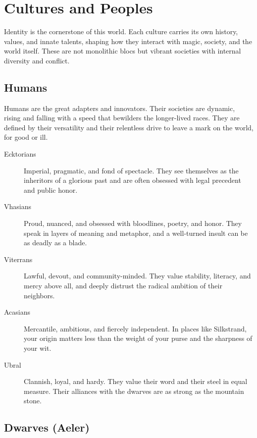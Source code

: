 \section*{Cultures and Peoples}

Identity is the cornerstone of this world. Each culture carries its own history, values, and innate talents, shaping how they interact with magic, society, and the world itself. These are not monolithic blocs but vibrant societies with internal diversity and conflict.

\subsection*{Humans}

Humans are the great adapters and innovators. Their societies are dynamic, rising and falling with a speed that bewilders the longer-lived races. They are defined by their versatility and their relentless drive to leave a mark on the world, for good or ill.

\begin{tcolorbox}[title=Human Subcultures of the Amaranthine, colback=red!5!white, colframe=red!75!black, fonttitle=\bfseries]
\begin{description}
    \item[Ecktorians] Imperial, pragmatic, and fond of spectacle. They see themselves as the inheritors of a glorious past and are often obsessed with legal precedent and public honor.
    \item[Vhasians] Proud, nuanced, and obsessed with bloodlines, poetry, and honor. They speak in layers of meaning and metaphor, and a well-turned insult can be as deadly as a blade.
    \item[Viterrans] Lawful, devout, and community-minded. They value stability, literacy, and mercy above all, and deeply distrust the radical ambition of their neighbors.
    \item[Acasians] Mercantile, ambitious, and fiercely independent. In places like Silkstrand, your origin matters less than the weight of your purse and the sharpness of your wit.
    \item[Ubral] Clannish, loyal, and hardy. They value their word and their steel in equal measure. Their alliances with the dwarves are as strong as the mountain stone.
\end{description}
\end{tcolorbox}

\subsection*{Dwarves (Aeler)}

